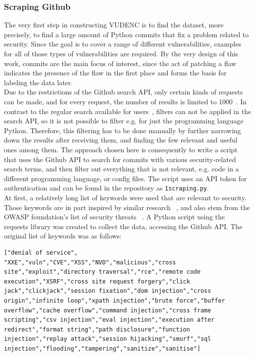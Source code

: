 \documentclass[
	a4paper,
	pagesize,
	pdftex,
	12pt,
	twoside, %
	BCOR=5mm, %
	ngerman,
	fleqn,
	final,
	]{scrartcl}
\begin{document}
\subsubsection{Scraping Github}
The very first step in constructing VUDENC is to find the dataset, more precisely, to find a large amount of Python commits that fix a problem related to security. Since the goal is to cover a range of different vulnerabilities, examples for all of those types of vulnerabilities are required. By the very design of this work, commits are the main focus of interest, since the act of patching a flaw indicates the presence of the flaw in the first place and forms the basis for labeling the data later.\\	
Due to the restrictions of the Github search API, only certain kinds of requests can be made, and for every request, the number of results is limited to 1000~\cite{Github.com.2}. In contrast to the regular search available for users~\cite{Github.com.2019}, filters can not be applied in the search API, so it is not possible to filter e.g. for just the programming language Python. Therefore, this filtering has to be done manually by further narrowing down the results after receiving them, and finding the few relevant and useful ones among them.
The approach chosen here is consequently to write a script that uses the Github API to search for commits with various security-related search terms, and then filter out everything that is not relevant, e.g. code in a different programming language, or config files. The script uses an API token for authentication and can be found in the repository as \texttt{1scraping.py}.\\
At first, a relatively long list of keywords were used that are relevant to security. Those keywords are in part inspired by similar research ~\cite{Zhou.2017}, and also stem from the OWASP foundation's list of security threats ~\cite{OWASPFoundation.}. A Python script using the requests library was created to collect the data, accessing the Github API. The original list of keywords was as follows:
\lstset{basicstyle=\small}
\begin{lstlisting}
["denial of service", "XXE","vuln","CVE","XSS","NVD","malicious","cross site","exploit","directory traversal","rce","remote code execution","XSRF","cross site request forgery","click jack","clickjack","session fixation","dom injection","cross origin","infinite loop","xpath injection","brute force","buffer overflow","cache overflow","command injection","cross frame scripting","csv injection","eval injection","execution after redirect","format string","path disclosure","function injection","replay attack","session hijacking","smurf","sql injection","flooding","tampering","sanitize","sanitise"]
\end{lstlisting}
\end{document}
